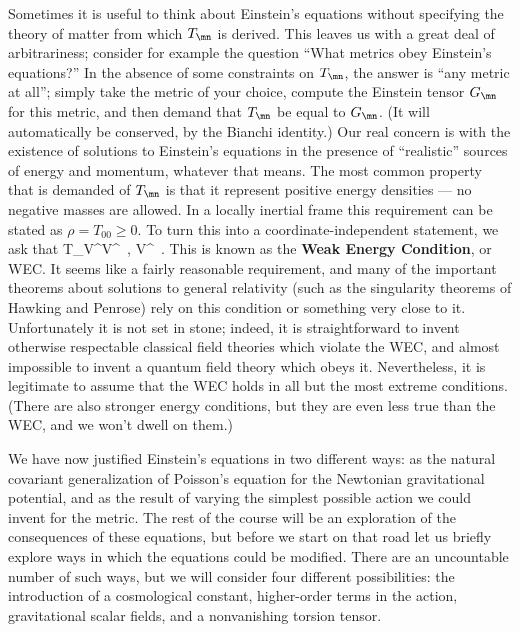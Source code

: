 \documentclass[12pt]{article}
\begin{document}
Sometimes it is useful to think about Einstein's equations without
specifying the theory of matter from which $T_\mn$ is derived.  
This leaves us with a great deal of arbitrariness; consider for
example the question ``What metrics obey Einstein's equations?''
In the absence of some constraints on $T_\mn$, the answer is ``any
metric at all''; simply take the metric of your choice, compute the
Einstein tensor $G_\mn$ for this metric, and then demand that
$T_\mn$ be equal to $G_\mn$.  (It will automatically be conserved,
by the Bianchi identity.)  Our real concern is with the existence
of solutions to Einstein's equations in the presence of ``realistic''
sources of energy and momentum, whatever that means.  The most
common property that is demanded of $T_\mn$ is that it represent
positive energy densities --- no negative masses are allowed.  In
a locally inertial frame this requirement can be stated as
$\rho = T_{00} \geq 0$.  To turn this into a coordinate-independent
statement, we ask that
\be
  T_\mn V^\mu V^\nu {}\ ,
  V^\mu\ .\label{4.72}
\ee
This is known as the {\bf Weak Energy Condition}, or WEC.  It seems 
like a fairly
reasonable requirement, and many of the important theorems about 
solutions to general relativity (such as the singularity theorems
of Hawking and Penrose) rely on this condition or something very
close to it.  Unfortunately it is not set in stone; indeed, it is
straightforward to invent otherwise respectable classical field
theories which violate the WEC, and almost impossible to invent a
quantum field theory which obeys it.  Nevertheless, it is legitimate
to assume that the WEC holds in all but the most extreme conditions.
(There are also stronger energy conditions, but they are even less
true than the WEC, and we won't dwell on them.)

We have now justified Einstein's equations in two different ways:
as the natural covariant generalization of Poisson's equation for
the Newtonian gravitational potential, and as the result of varying
the simplest possible action we could invent for the metric.  The
rest of the course will be an exploration of the consequences of
these equations, but before we start on that road let us briefly
explore ways in which the equations could be modified.  There are
an uncountable number of such ways, but we will consider four
different possibilities: the introduction of a cosmological constant,
higher-order terms in the action, gravitational scalar fields, and
a nonvanishing torsion tensor.
\end{document}
